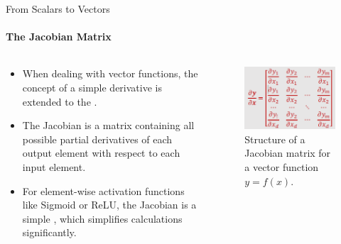 \begin{frame}{From Scalars to Vectors}
    \framesubtitle{The Jacobian Matrix}
    \begin{columns}[c]
        \begin{column}{0.5\linewidth}
            \begin{itemize}
                \item When dealing with vector functions, the concept of a simple derivative is extended to the .
                \item The Jacobian is a matrix containing all possible partial derivatives of each output element with respect to each input element.
                \item For element-wise activation functions like Sigmoid or ReLU, the Jacobian is a simple , which simplifies calculations significantly.
            \end{itemize}
        \end{column}
        \begin{column}{0.5\linewidth}
            \begin{figure}
                \centering
                \includegraphics[width=0.8\linewidth]{images/jacobian_matrix.png}
                \caption{Structure of a Jacobian matrix for a vector function $y = f(x)$.}
            \end{figure}
        \end{column}
    \end{columns}
\end{frame}

